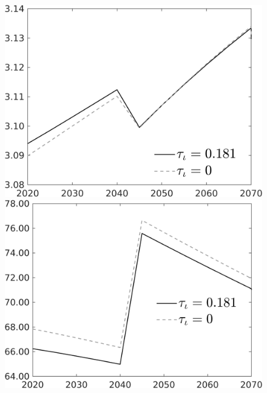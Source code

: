 \documentclass[12pt]{article}
\begin{document}
\begin{figure}[h!!]
\begin{minipage}[]{0.32\textwidth}
\end{minipage}	
\begin{minipage}[]{0.32\textwidth}
\includegraphics[width=1\textwidth]{../../codding_model/own_basedOnFried/optimalPol_010922_revision/figures/all_13Sept22/CompTauf_bytaul_Reg0_gAn_spillover0_nsk0_xgr0_knspil1_sep1_LFlimit1_emsbase0_countec0_GovRev0_etaa0.79_lgd1.png}
\end{minipage}	
\begin{minipage}[]{0.32\textwidth}
\includegraphics[width=1\textwidth]{../../codding_model/own_basedOnFried/optimalPol_010922_revision/figures/all_13Sept22/CompTauf_bytaul_Reg0_gAg_spillover0_nsk0_xgr0_knspil1_sep1_LFlimit1_emsbase0_countec0_GovRev0_etaa0.79_lgd1.png}
\end{minipage}	
\end{figure}
\end{document}

